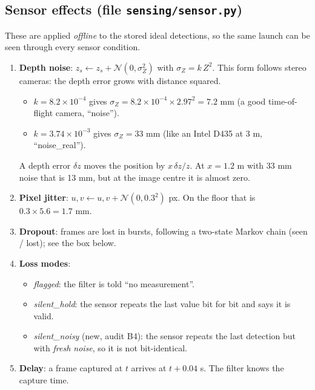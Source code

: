 \documentclass[11pt,a4paper]{article}
\begin{document}
\subsection{Sensor effects (file \texttt{sensing/sensor.py})}
These are applied \emph{offline} to the stored ideal detections, so the same launch can be seen through every sensor
condition.
\begin{enumerate}
\item \textbf{Depth noise}: $z_s \leftarrow z_s + \mathcal N(0,\sigma_Z^2)$ with $\sigma_Z = k\,Z^2$. This form follows
  stereo cameras: the depth error grows with distance squared.
  \begin{itemize}
  \item $k=8.2\times10^{-4}$ gives $\sigma_Z = 8.2\times10^{-4}\times2.97^2 = 7.2$ mm (a good time-of-flight camera, ``noise'').
  \item $k=3.74\times10^{-3}$ gives $\sigma_Z=33$ mm (like an Intel D435 at 3 m, ``noise\_real'').
  \end{itemize}
  A depth error $\delta z$ moves the position by $x\,\delta z/z$. At $x=1.2$ m with 33 mm noise that is 13 mm, but at the
  image centre it is almost zero.
\item \textbf{Pixel jitter}: $u,v \leftarrow u,v+\mathcal N(0,0.3^2)$ px. On the floor that is $0.3\times5.6=1.7$ mm.
\item \textbf{Dropout}: frames are lost in bursts, following a two-state Markov chain (seen / lost); see the box below.
\item \textbf{Loss modes}:
  \begin{itemize}
  \item \emph{flagged}: the filter is told ``no measurement''.
  \item \emph{silent\_hold}: the sensor repeats the last value bit for bit and says it is valid.
  \item \emph{silent\_noisy} (new, audit B4): the sensor repeats the last detection but with \emph{fresh noise}, so it is
    not bit-identical.
  \end{itemize}
\item \textbf{Delay}: a frame captured at $t$ arrives at $t+0.04$ s. The filter knows the capture time.
\end{enumerate}
\end{document}
